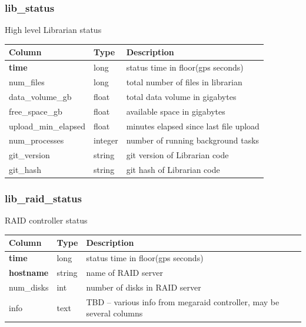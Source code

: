 \documentclass{article}
\begin{document}
{\subsubsection{lib\_status}
High level Librarian status
\begin{center}
 \begin{tabular}{| p{4cm} | p{2cm} | p{10cm} |}
\hline
 {\bf Column} & {\bf Type}  & {\bf Description} \\ [0.5ex]  \hline\hline
\textbf{time} & long & status time in floor(gps seconds) \\ \hline
num\_files & long & total number of files in librarian  \\\hline
data\_volume\_gb & float & total data volume in gigabytes  \\\hline
free\_space\_gb & float & available space in gigabytes  \\\hline
upload\_min\_elapsed & float & minutes elapsed since last file upload \\\hline
num\_processes & integer & number of running background tasks  \\\hline
git\_version & string & git version of Librarian code  \\\hline
git\_hash & string & git hash of Librarian code  \\\hline
\end{tabular}
\end{center}

\subsubsection{lib\_raid\_status}
RAID controller status
\begin{center}
 \begin{tabular}{| p{4cm} | p{2cm} | p{10cm} |}
\hline
 {\bf Column} & {\bf Type}  & {\bf Description} \\ [0.5ex]  \hline\hline
\textbf{time} & long & status time in floor(gps seconds) \\ \hline
\textbf{hostname} & string & name of RAID server \\ \hline
num\_disks & int & number of disks in RAID server  \\\hline
info & text & TBD -- various info from megaraid controller, may be several columns \\\hline
\end{tabular}
\end{center}

}
\end{document}
